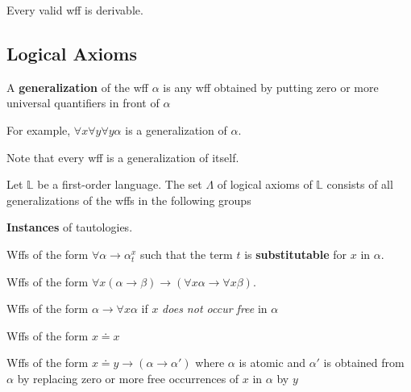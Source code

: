 \begin{theorem}[Completeness]
    \label{thm:FOCompleteness}
    Every valid wff is derivable.
\end{theorem}

\subsection{Logical Axioms}

\begin{definition}[Generalization]
    A \textbf{generalization} of the wff $\alpha$ is any wff obtained by putting zero or more universal quantifiers in front of $\alpha$
\end{definition}

For example, $\forall x\forall y\forall y\alpha$ is a generalization of $\alpha$.

Note that every wff is a generalization of itself.

\begin{definition}[Axioms]
    Let $\mathbb{L}$ be a first-order language. The set $\Lambda$ of logical axioms of $\mathbb{L}$ consists of all generalizations of the wffs in the following groups
    \begin{axiom}
        \label{axiom:InstanceOfTautology}
        \textbf{Instances} of tautologies.
    \end{axiom}
    \begin{axiom}
        \label{axiom:Substitution}
        Wffs of the form $\forall \alpha \to \alpha_t^x$ such that the term $t$ is \textbf{substitutable} for $x$ in $\alpha$.
    \end{axiom}
    \begin{axiom}
        \label{axiom:PushUniversalIntoImplication}
        Wffs of the form $\forall x(\alpha\to\beta) \to (\forall x \alpha\to \forall x \beta)$.
    \end{axiom}
    \begin{axiom}
        \label{axiom:QuantifyBoundedVar}
        Wffs of the form $\alpha\to\forall x \alpha$ if $x$ \emph{does not occur free} in $\alpha$
    \end{axiom}
    \begin{axiom}
        \label{axiom:Equality}
        Wffs of the form $x \doteq x$
    \end{axiom}
    \begin{axiom}
        \label{axiom:EqualitySubstitution}
        Wffs of the form $x \doteq y \to (\alpha \to \alpha')$ where $\alpha$ is atomic and $\alpha'$ is obtained from $\alpha$ by replacing zero or more free occurrences of $x$ in $\alpha$ by $y$
    \end{axiom}
\end{definition}

